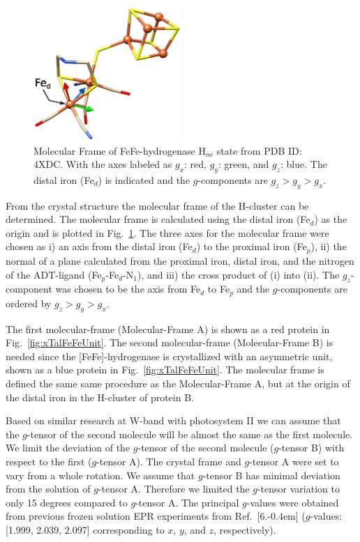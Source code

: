 \begin{figure}[ht]
 \centering
 \includegraphics[width=0.5\textwidth]{Kapitel/Ch1-images/Ch2-MolFrame.eps}
 \caption[Molecular Frame of FeFe-hydrogenase H$_{ox}$ state.]{Molecular Frame of FeFe-hydrogenase H$_{ox}$ state from PDB ID: 4XDC. With the axes labeled as $g_x$: red, $g_y$: green, and $g_z$: blue. The distal iron (Fe$_d$) is indicated and the $g$-components are $g_z>g_y>g_x$.}
 \label{fig:MolecularFrame}
\end{figure}

From the crystal structure the molecular frame of the H-cluster can be determined. The molecular frame is calculated using the distal iron (Fe$_d$) as the origin and is plotted in Fig.~\ref{fig:MolecularFrame}. The three axes for the molecular frame were chosen as i) an axis from the distal iron (Fe$_d$) to the proximal iron (Fe$_p$), ii) the normal of a plane calculated from the proximal iron, distal iron, and the nitrogen of the ADT-ligand  (Fe$_p$-Fe$_d$-N$_1$), and iii) the cross product of (i) into (ii). The $g_z$-component was chosen to be the axis from Fe$_d$ to Fe$_p$ and the $g$-components are ordered by $g_z>g_y>g_x$. 

The first molecular-frame (Molecular-Frame A) is shown as a red protein in Fig.~\ref{fig:xTalFeFeUnit}. The second molecular-frame (Molecular-Frame B) is needed since the [FeFe]-hydrogenase is crystallized with an asymmetric unit, shown as a blue protein in Fig.~\ref{fig:xTalFeFeUnit}. The molecular frame is defined the same same procedure as the Molecular-Frame A, but at the origin of the distal iron in the H-cluster of protein B.

Based on similar research at W-band with photosystem II we can assume that the $g$-tensor of the second molecule will be almost the same as the first molecule. \cite{Hofbauer6623, B908093G} We limit the deviation of the $g$-tensor of the second molecule ($g$-tensor B) with respect to the first ($g$-tensor A). The crystal frame and $g$-tensor A were set to vary from a whole rotation. We assume that $g$-tensor B has minimal deviation from the solution of $g$-tensor A. Therefore we limited the $g$-tensor variation to only 15 degrees compared to $g$-tensor A. The principal $g$-values were obtained from previous frozen solution EPR experiments from Ref.~[6.\kern-0.4em] ($g$-values: [1.999, 2.039, 2.097] corresponding to $x$, $y$, and $z$, respectively).

